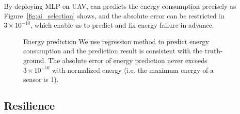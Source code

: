 By deploying MLP on UAV, {\sdn} can predicts the energy consumption precisely as
Figure~\ref{fig:ai_selection} shows, and the absolute error can be restricted in
$3\times10^{-10}$, which enable us to predict and fix energy failure in advance.

\begin{figure}[htbp]
	\centering
	\hspace{-0.3cm}
	\hspace{-0.2cm}
	\vspace{-0.1in}
	\caption{Energy prediction
		\textnormal{
			We use regression method to predict energy consumption and the
			prediction result is consistent with the truth-ground.  The absolute
			error of energy prediction never exceeds $3\times10^{-10}$ with normalized energy
			(i.e. the maximum energy of a sensor is 1).
		}
	}
	\label{fig:energy_pred}
\end{figure}

\subsection{Resilience}

